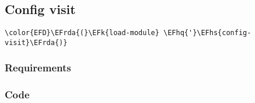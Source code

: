 \documentclass[a4wide,10pt]{article}
\newcommand{\EFk}[1]{\textcolor{EFk}{#1}} %
\newcommand{\EFhq}[1]{\textcolor{EFhq}{#1}} %
\newcommand{\EFhs}[1]{\textcolor{EFhs}{#1}} %
\newcommand{\EFrda}[1]{\textcolor{EFrda}{#1}} %
\begin{document}
\subsection{Config visit}
\label{sec:org7aecc8b}
\begin{Code}
\begin{Verbatim}
\color{EFD}\EFrda{(}\EFk{load-module} \EFhq{'}\EFhs{config-visit}\EFrda{)}
\end{Verbatim}
\end{Code}
\subsubsection{Requirements}
\label{sec:org0ef2352}
\subsubsection{Code}
\label{sec:orgc26c547}
\end{document}

